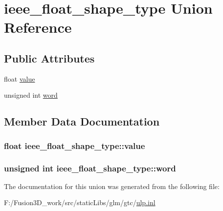 \hypertarget{unionieee__float__shape__type}{}\section{ieee\+\_\+float\+\_\+shape\+\_\+type Union Reference}
\label{unionieee__float__shape__type}
\subsection*{Public Attributes}
\begin{DoxyCompactItemize}
\item 
float \hyperlink{unionieee__float__shape__type_aa0c47451f1b974421cbb9e2833ddb68e}{value}
\item 
unsigned int \hyperlink{unionieee__float__shape__type_a49230c21acd672d044f38b1abcbd6071}{word}
\end{DoxyCompactItemize}


\subsection{Member Data Documentation}
\hypertarget{unionieee__float__shape__type_aa0c47451f1b974421cbb9e2833ddb68e}{}
\subsubsection[{value}]{\setlength{\rightskip}{0pt plus 5cm}float ieee\+\_\+float\+\_\+shape\+\_\+type\+::value}\label{unionieee__float__shape__type_aa0c47451f1b974421cbb9e2833ddb68e}
\hypertarget{unionieee__float__shape__type_a49230c21acd672d044f38b1abcbd6071}{}
\subsubsection[{word}]{\setlength{\rightskip}{0pt plus 5cm}unsigned int ieee\+\_\+float\+\_\+shape\+\_\+type\+::word}\label{unionieee__float__shape__type_a49230c21acd672d044f38b1abcbd6071}


The documentation for this union was generated from the following file\+:\begin{DoxyCompactItemize}
\item 
F\+:/\+Fusion3\+D\+\_\+work/src/static\+Libs/glm/gtc/\hyperlink{ulp_8inl}{ulp.\+inl}\end{DoxyCompactItemize}
